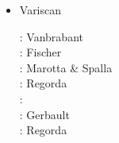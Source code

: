 \begin{itemize}
\item Variscan 

\begin{scriptsize}
\nineteenninetynine: Vanbrabant \etal \cite{vajh99}\\
\twothousandfour: Fischer \etal \cite{fijj04} \\
\twothousandseven: Marotta \& Spalla \cite{masp07} \\
\twothousandthirteen: Regorda \etal \cite{rems13} \\
\twothousandseventeen: \cite{regorda} \\
\twothousandeighteen: Gerbault \etal \cite{gesr18} \\
\twothousandtwenty: Regorda \etal \cite{relr20}
\end{scriptsize}


\end{itemize}






